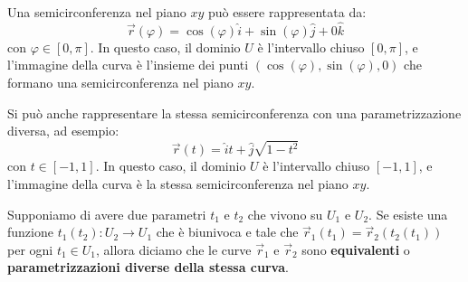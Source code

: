 \begin{example}[Semicirconferenza]\label{ex:semicirconferenza}
    Una semicirconferenza nel piano $xy$ può essere rappresentata da:
    \begin{equation*}
        \vec r(\varphi) = \cos(\varphi)\hat i + \sin(\varphi)\hat j + 0\hat k
    \end{equation*}
    con $\varphi \in [0, \pi]$. In questo caso, il dominio $U$ è l'intervallo chiuso $[0, \pi]$, e l'immagine della curva è l'insieme dei punti $(\cos(\varphi), \sin(\varphi), 0)$ che formano una semicirconferenza nel piano $xy$.

    \begin{figure}[H]
    \centering
    \end{figure}
    
    Si può anche rappresentare la stessa semicirconferenza con una parametrizzazione diversa, ad esempio:
    \begin{equation*}
        \vec r(t) = \hat i t + \hat j \sqrt{1 - t^2}
    \end{equation*}
    con $t \in [-1, 1]$. In questo caso, il dominio $U$ è l'intervallo chiuso $[-1, 1]$, e l'immagine della curva è la stessa semicirconferenza nel piano $xy$.
\end{example}

\begin{definition}
    Supponiamo di avere due parametri $t_1$ e $t_2$ che vivono su $U_1$ e $U_2$. Se esiste una funzione $t_1(t_2): U_2 \to U_1$ che è biunivoca e tale che $\vec r_1(t_1) = \vec r_2(t_2(t_1))$ per ogni $t_1 \in U_1$, allora diciamo che le curve $\vec r_1$ e $\vec r_2$ sono \textbf{equivalenti} o \textbf{parametrizzazioni diverse della stessa curva}.
\end{definition}

